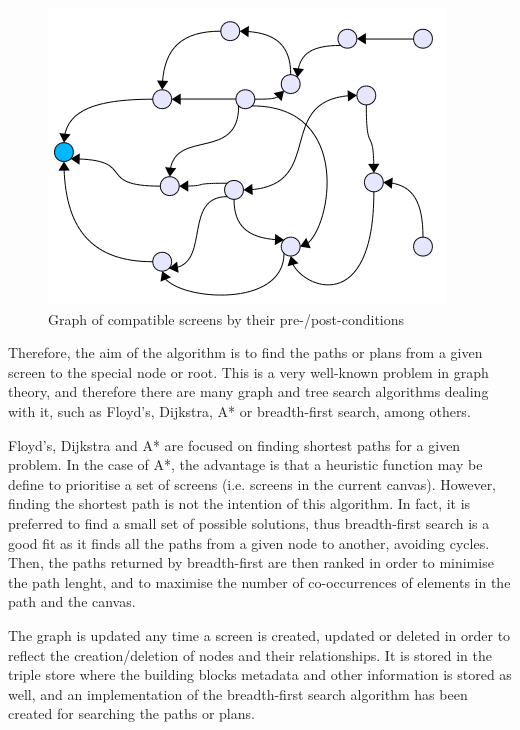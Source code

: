 \documentclass{fast_latex}
\begin{document}
\begin{figure}[htb]
\label{fig:screens_graph}
\begin{center}
	\includegraphics{images/screens_graph}
	\caption{Graph of compatible screens by their pre-/post-conditions}
\end{center}
\end{figure}

Therefore, the aim of the algorithm is to find the paths or plans from a given screen to the special node or root. This is a very well-known problem in graph theory, and therefore there are many graph and tree search algorithms dealing with it, such as Floyd's, Dijkstra, A* or breadth-first search, among others.

Floyd's, Dijkstra and A* are focused on finding shortest paths for a given problem. In the case of A*, the advantage is that a heuristic function may be define to prioritise a set of screens (i.e. screens in the current canvas). However, finding the shortest path is not the intention of this algorithm. In fact, it is preferred to find a small set of possible solutions, thus breadth-first search is a good fit as it finds all the paths from a given node to another, avoiding cycles. Then, the paths returned by breadth-first are then ranked in order to minimise the path lenght, and to maximise the number of co-occurrences of elements in the path and the canvas.

The graph is updated any time a screen is created, updated or deleted in order to reflect the creation/deletion of nodes and their relationships. It is stored in the triple store where the building blocks metadata and other information is stored as well, and an implementation of the breadth-first search algorithm has been created for searching the paths or plans.
\end{document}
